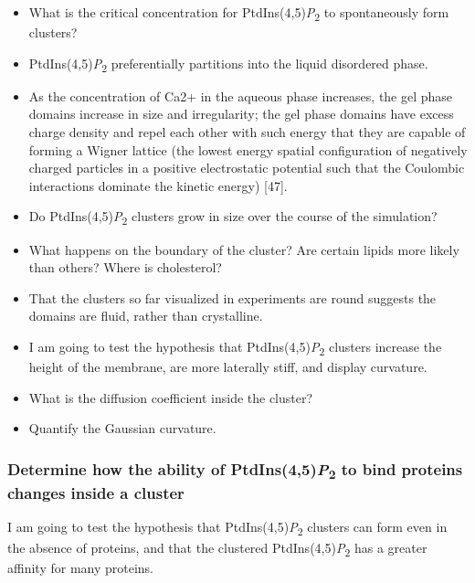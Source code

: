 \documentclass[11pt,notitlepage]{article}
\providecommand{\tightlist}{%
  \setlength{\itemsep}{0pt}\setlength{\parskip}{0pt}}
\begin{document}
\begin{itemize}
\tightlist
\item
  What is the critical concentration for
  PtdIns(4,5)\emph{P}\textsubscript{2} to spontaneously form clusters?
\item
  PtdIns(4,5)\emph{P}\textsubscript{2} preferentially partitions into
  the liquid disordered phase.
\item
  As the concentration of Ca2+ in the aqueous phase increases, the gel
  phase domains increase in size and irregularity; the gel phase domains
  have excess charge density and repel each other with such energy that
  they are capable of forming a Wigner lattice (the lowest energy
  spatial configuration of negatively charged particles in a positive
  electrostatic potential such that the Coulombic interactions dominate
  the kinetic energy) {[}47{]}.
\item
  Do PtdIns(4,5)\emph{P}\textsubscript{2} clusters grow in size over the
  course of the simulation?
\item
  What happens on the boundary of the cluster? Are certain lipids more
  likely than others? Where is cholesterol?
\item
  That the clusters so far visualized in experiments are round suggests
  the domains are fluid, rather than crystalline.
\item
  I am going to test the hypothesis that
  PtdIns(4,5)\emph{P}\textsubscript{2} clusters increase the height of
  the membrane, are more laterally stiff, and display curvature.
\item
  What is the diffusion coefficient inside the cluster?
\item
  Quantify the Gaussian curvature.
\end{itemize}

\hypertarget{determine-how-the-ability-of-ptdins45p2-to-bind-proteins-changes-inside-a-cluster}{%
\subsubsection{\texorpdfstring{Determine how the ability of
PtdIns(4,5)\emph{P}\textsubscript{2} to bind proteins changes inside a
cluster}{Determine how the ability of PtdIns(4,5)P2 to bind proteins changes inside a cluster}}\label{determine-how-the-ability-of-ptdins45p2-to-bind-proteins-changes-inside-a-cluster}}

I am going to test the hypothesis that
PtdIns(4,5)\emph{P}\textsubscript{2} clusters can form even in the
absence of proteins, and that the clustered
PtdIns(4,5)\emph{P}\textsubscript{2} has a greater affinity for many
proteins.
\end{document}
